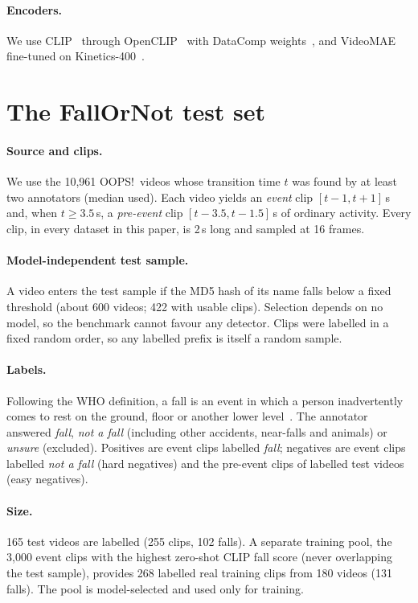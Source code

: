 \documentclass[10pt,twocolumn,letterpaper]{article}
\begin{document}
\paragraph{Encoders.} We use CLIP~\cite{radford2021clip} through OpenCLIP~\cite{openclip} with DataComp weights~\cite{gadre2023datacomp}, and VideoMAE~\cite{tong2022videomae} fine-tuned on Kinetics-400~\cite{kay2017kinetics}.

\section{The FallOrNot test set}
\paragraph{Source and clips.} We use the 10,961 OOPS!\ videos whose transition time $t$ was found by at least two annotators (median used). Each video yields an \emph{event} clip $[t-1, t+1]$\,s and, when $t\ge3.5$\,s, a \emph{pre-event} clip $[t-3.5, t-1.5]$\,s of ordinary activity. Every clip, in every dataset in this paper, is 2\,s long and sampled at 16 frames.

\paragraph{Model-independent test sample.} A video enters the test sample if the MD5 hash of its name falls below a fixed threshold (about 600 videos; 422 with usable clips). Selection depends on no model, so the benchmark cannot favour any detector. Clips were labelled in a fixed random order, so any labelled prefix is itself a random sample.

\paragraph{Labels.} Following the WHO definition, a fall is an event in which a person inadvertently comes to rest on the ground, floor or another lower level~\cite{who_falls}. The annotator answered \emph{fall}, \emph{not a fall} (including other accidents, near-falls and animals) or \emph{unsure} (excluded). Positives are event clips labelled \emph{fall}; negatives are event clips labelled \emph{not a fall} (hard negatives) and the pre-event clips of labelled test videos (easy negatives).

\paragraph{Size.} 165 test videos are labelled (255 clips, 102 falls). A separate training pool, the 3,000 event clips with the highest zero-shot CLIP fall score (never overlapping the test sample), provides 268 labelled real training clips from 180 videos (131 falls). The pool is model-selected and used only for training.
\end{document}
